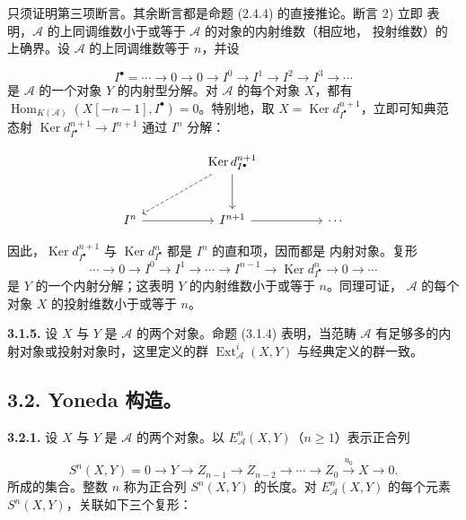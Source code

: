 \clearpage
{}%
\begingroup\small\setlength{\parskip}{0pt}\setlength{\emergencystretch}{1.5em}
\setlength{\abovedisplayskip}{4pt plus 2pt minus 2pt}%
\setlength{\belowdisplayskip}{4pt plus 2pt minus 2pt}%

只须证明第三项断言。其余断言都是命题 (2.4.4) 的直接推论。断言 2) 立即
表明，$\mathcal A$ 的上同调维数小于或等于 $\mathcal A$ 的对象的内射维数（相应地，
投射维数）的上确界。设 $\mathcal A$ 的上同调维数等于 $n$，并设

\[
I^\bullet=\cdots\longrightarrow0\longrightarrow0\longrightarrow I^0
\longrightarrow I^1\longrightarrow I^2\longrightarrow I^3
\longrightarrow\cdots
\]
是 $\mathcal A$ 的一个对象 $Y$ 的内射型分解。对 $\mathcal A$ 的每个对象
$X$，都有
$\operatorname{Hom}_{K(\mathcal A)}(X[-n-1],I^\bullet)=0$。特别地，取
$X=\operatorname{Ker}d_{I^\bullet}^{n+1}$，立即可知典范态射
$\operatorname{Ker}d_{I^\bullet}^{n+1}\longrightarrow I^{n+1}$ 通过
$I^n$ 分解：

\[
\begin{tikzcd}[column sep=4.8em,row sep=2.8em]
{} & \operatorname{Ker}d_{I^\bullet}^{n+1}
  \arrow[dl,dashed] \arrow[d] & {} \\
I^n \arrow[r] & I^{n+1} \arrow[r] & \cdots
\end{tikzcd}
\]

因此，$\operatorname{Ker}d_{I^\bullet}^{n+1}$ 与
$\operatorname{Ker}d_{I^\bullet}^{n}$ 都是 $I^n$ 的直和项，因而都是
内射对象。复形
\[
\cdots\longrightarrow0\longrightarrow I^0\longrightarrow I^1
\longrightarrow\cdots\longrightarrow I^{n-1}
\longrightarrow\operatorname{Ker}d_{I^\bullet}^{n}
\longrightarrow0\longrightarrow\cdots
\]
是 $Y$ 的一个内射分解；这表明 $Y$ 的内射维数小于或等于 $n$。同理可证，
$\mathcal A$ 的每个对象 $X$ 的投射维数小于或等于 $n$。

\medskip\noindent\textbf{3.1.5.}\quad
设 $X$ 与 $Y$ 是 $\mathcal A$ 的两个对象。命题 (3.1.4) 表明，当范畴
$\mathcal A$ 有足够多的内射对象或投射对象时，这里定义的群
$\operatorname{Ext}_{\mathcal A}^{i}(X,Y)$ 与经典定义的群一致。

\subsection*{3.2. Yoneda 构造。}

\noindent\textbf{3.2.1.}\quad
设 $X$ 与 $Y$ 是 $\mathcal A$ 的两个对象。以
$E_{\mathcal A}^{n}(X,Y)$（$n\geq1$）表示正合列

\[
S^n(X,Y)=0\longrightarrow Y\longrightarrow Z_{n-1}
\longrightarrow Z_{n-2}\longrightarrow\cdots\longrightarrow Z_0
\xrightarrow{u_0}X\longrightarrow0.
\]
所成的集合。整数 $n$ 称为正合列 $S^n(X,Y)$ 的长度。对
$E_{\mathcal A}^{n}(X,Y)$ 的每个元素 $S^n(X,Y)$，关联如下三个复形：
\endgroup
